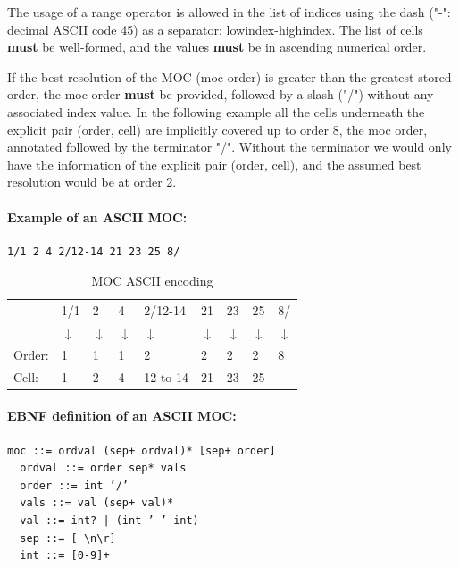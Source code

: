 \documentclass[11pt,a4paper]{ivoa}
\begin{document}
The usage of a range operator is allowed in the list of indices using the
dash ("-": decimal ASCII code 45) as a separator: lowindex-highindex.
The list of cells {\bf must} be well-formed, and the values {\bf must}
be in ascending numerical order.

If the best resolution of the MOC (moc order) is greater than the
greatest stored order, the moc order {\bf must} be provided, followed
by a slash ("/") without any associated index value.
In the following example all the
cells underneath the explicit pair (order, cell) are implicitly covered
up to order 8, the moc order, annotated followed by the terminator "/".
Without the terminator we would only have the information of the explicit
pair (order, cell), and the assumed best resolution would be at order 2.   


\paragraph{Example of an ASCII MOC:}
\begin{Verbatim}[frame=single]
    1/1 2 4 2/12-14 21 23 25 8/
\end{Verbatim}

\begin{table}[!htbp]
\begin{center}
   {\small
   \begin{tabular} { l l l l l l l l l }
   & 1/1   & 2  & 4  & 2/12-14 & 21 & 23 &  25 & 8/ \\
   & $\downarrow$ & $\downarrow$ & $\downarrow$ & $\downarrow$ & $\downarrow$ & $\downarrow$ & $\downarrow$ & $\downarrow$ \\
Order:     & 1    & 1 & 1 & 2        & 2  &  2 & 2  & 8 \\
Cell:      & 1    & 2 & 4 & 12 to 14 & 21 & 23 & 25 & \\
\end{tabular}
}
\end{center}
\caption*{MOC ASCII encoding}\label{table:moc-ascii-ex}
\end{table}


\paragraph{EBNF definition of an ASCII MOC:}
\begin{Verbatim}[frame=single]
  moc ::= ordval (sep+ ordval)* [sep+ order]
  ordval ::= order sep* vals
  order ::= int ’/’
  vals ::= val (sep+ val)*
  val ::= int? | (int ’-’ int)
  sep ::= [ \n\r]
  int ::= [0-9]+
\end{Verbatim}
\end{document}
